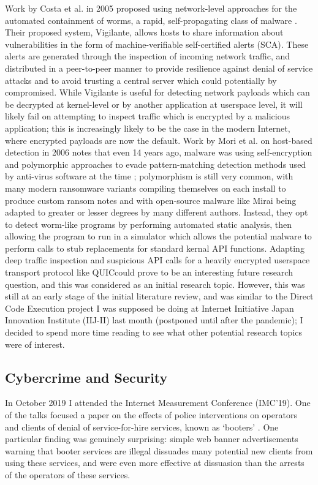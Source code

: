 \documentclass[10pt,sigconf]{acmart}
\begin{document}
Work by Costa et al. in 2005 proposed using network-level approaches for the automated containment of worms, a rapid, self-propagating class of malware \cite{costa2005}.
Their proposed system, Vigilante, allows hosts to share information about vulnerabilities in the form of machine-verifiable self-certified alerts (SCA).
These alerts are generated through the inspection of incoming network traffic, and distributed in a peer-to-peer manner to provide resilience against denial of service attacks and to avoid trusting a central server which could potentially by compromised.
While Vigilante is useful for detecting network payloads which can be decrypted at kernel-level or by another application at userspace level, it will likely fail on attempting to inspect traffic which is encrypted by a malicious application;
this is increasingly likely to be the case in the modern Internet, where encrypted payloads are now the default.
Work by Mori et al. on host-based detection in 2006 notes that even 14 years ago, malware was using self-encryption and polymorphic approaches to evade pattern-matching detection methods used by anti-virus software at the time \cite{mori2006};
polymorphism is still very common, with many modern ransomware variants compiling themselves on each install to produce custom ransom notes and with open-source malware like Mirai being adapted to greater or lesser degrees by many different authors.
Instead, they opt to detect worm-like programs by performing automated static analysis, then allowing the program to run in a simulator which allows the potential malware to perform calls to stub replacements for standard kernal API functions.
Adapting deep traffic inspection and suspicious API calls for a heavily encrypted userspace transport protocol like QUICcould prove to be an interesting future research question, and this was considered as an initial research topic.
However, this was still at an early stage of the initial literature review, and was similar to the Direct Code Execution \cite{tazaki2013} project I was supposed be doing at Internet Initiative Japan Innovation Institute (IIJ-II) last month (postponed until after the pandemic);
I decided to spend more time reading to see what other potential research topics were of interest.

\subsection{Cybercrime and Security}
\label{cybersecurity}
In October 2019 I attended the Internet Measurement Conference (IMC'19).
One of the talks focused a paper on the effects of police interventions on operators and clients of denial of service-for-hire services, known as `booters' \cite{collier2019}.
One particular finding was genuinely surprising:
simple web banner advertisements warning that booter services are illegal dissuades many potential new clients from using these services, and were even more effective at dissuasion than the arrests of the operators of these services.
\end{document}
